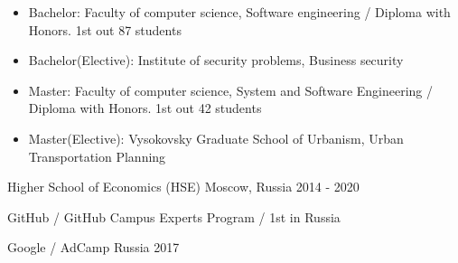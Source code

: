 \vspace{-0.3cm}

\cventryeducation
{
\vspace{-0.4cm}
\begin{itemize}
\item Bachelor: Faculty of computer science, Software engineering / Diploma with Honors. 1st out 87 students
\item Bachelor(Elective): Institute of security problems, Business security
\item Master: Faculty of computer science, System and Software Engineering / Diploma with Honors. 1st out 42 students
\item Master(Elective): Vysokovsky Graduate School of Urbanism, Urban Transportation Planning
\end{itemize}
} %
{Higher School of Economics (HSE)} %
{Moscow, Russia} %
{2014 - 2020} %

\vspace{-0.5cm}
\cventryeducation
{} %
{GitHub / GitHub Campus Experts Program / 1st in Russia} %
{} %
{} %

\vspace{-0.5cm}
\cventryeducation
{} %
{Google / AdCamp Russia 2017} %
{} %
{} %




